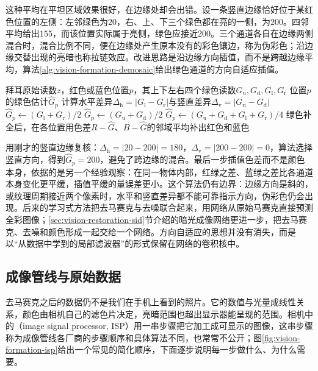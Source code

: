 这种平均在平坦区域效果很好，在边缘处却会出错。设一条竖直边缘恰好位于某红色位置的左侧：左邻绿色为$20$，右、上、下三个绿色都在亮的一侧，为$200$。四邻平均给出$155$，而该位置实际属于亮侧，绿色应接近$200$。三个通道各自在边缘两侧混合时，混合比例不同，便在边缘处产生原本没有的彩色镶边，称为伪彩色；沿边缘交替出现的亮暗也称拉链效应。改进思路是沿边缘方向插值，而不是跨越边缘平均，算法\ref{alg:vision-formation-demosaic}给出绿色通道的方向自适应插值。

\begin{algorithm}[方向自适应的绿色插值]
  \label{alg:vision-formation-demosaic}
  \begin{algorithmic}[1]
    \Require 拜耳原始读数$z$，红色或蓝色位置$p$，其上下左右四个绿色读数$G_{\mathrm u},G_{\mathrm d},G_{\mathrm l},G_{\mathrm r}$
    \Ensure 位置$p$的绿色估计$\hat G_p$
    \State 计算水平差异$\Delta_{\mathrm h}=\lvert G_{\mathrm l}-G_{\mathrm r}\rvert$与竖直差异$\Delta_{\mathrm v}=\lvert G_{\mathrm u}-G_{\mathrm d}\rvert$
      \State $\hat G_p\gets(G_{\mathrm l}+G_{\mathrm r})/2$
      \State $\hat G_p\gets(G_{\mathrm u}+G_{\mathrm d})/2$
    \Else
      \State $\hat G_p\gets(G_{\mathrm u}+G_{\mathrm d}+G_{\mathrm l}+G_{\mathrm r})/4$
    \EndIf
    \State 绿色补全后，在各位置用色差$R-\hat G$、$B-\hat G$的邻域平均补出红色和蓝色
  \end{algorithmic}
\end{algorithm}

用刚才的竖直边缘复核：$\Delta_{\mathrm h}=\lvert20-200\rvert=180$，$\Delta_{\mathrm v}=\lvert200-200\rvert=0$，算法选择竖直方向，得到$\hat G_p=200$，避免了跨边缘的混合。最后一步插值色差而不是颜色本身，依据的是另一个经验观察：在同一物体内部，红绿之差、蓝绿之差比各通道本身变化更平缓，插值平缓的量误差更小。这个算法仍有边界：边缘方向是斜的，或纹理周期接近两个像素时，水平和竖直差异都不能可靠指示方向，伪彩色仍会出现。后来的学习式方法把去马赛克与去噪联合起来，用网络从原始马赛克直接预测全彩图像；\ref{sec:vision-restoration-sid}节介绍的暗光成像网络更进一步，把去马赛克、去噪和颜色形成一起交给一个网络。方向自适应的思想并没有消失，而是以“从数据中学到的局部滤波器”的形式保留在网络的卷积核中。

\subsection{成像管线与原始数据}
\label{sec:vision-formation-isp}

去马赛克之后的数据仍不是我们在手机上看到的照片。它的数值与光量成线性关系，颜色由相机自己的滤色片决定，亮暗范围也超出显示器能呈现的范围。相机中的（image signal processor, ISP）用一串步骤把它加工成可显示的图像，这串步骤称为成像管线各厂商的步骤顺序和具体算法不同，也常常不公开；图\ref{fig:vision-formation-isp}给出一个常见的简化顺序，下面逐步说明每一步做什么、为什么需要。

